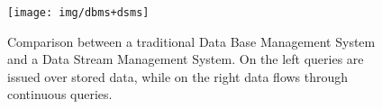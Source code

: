 \begin{figure}[b!]
	\centering
	\texttt{[image: img/dbms+dsms]}
	\caption{Comparison between a traditional Data Base Management System and a Data Stream Management System. On the
left queries are issued over stored data, while on the right data flows through continuous queries.}
	\label{fig:dbms+dsms}
\end{figure}


